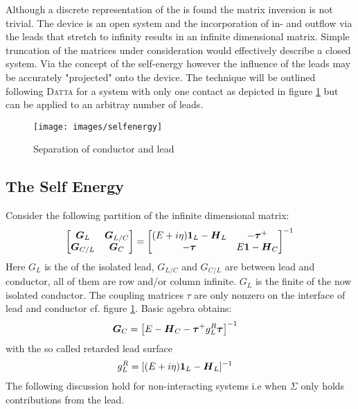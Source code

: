 Although a discrete representation of the \hamil{} is found the matrix inversion is not trivial. The device is an open system and the incorporation of in- and outflow via the leads that stretch to infinity results in an infinite dimensional matrix.
Simple truncation of the matrices under consideration would effectively describe a closed system. Via the concept of the self-energy however the influence of the leads may be accurately "projected" onto the device.
The technique will be outlined following \textsc{Datta} for a system with only one contact as depicted in figure \ref{fig:selfenergy} but can be applied to an arbitray number of leads. \begin{figure}[h!]
\centering
\texttt{[image: images/selfenergy]}
\caption{Separation of conductor and lead}
\label{fig:selfenergy}
\end{figure}

\subsection{The Self Energy}
Consider the following partition of the infinite dimensional \gfnc{} matrix:
\begin{align}
  \begin{bmatrix}
  \boldsymbol{G}_{L} & \boldsymbol{G}_{L/C}\\
  \boldsymbol{G}_{C/L} & \boldsymbol{G}_{C}
  \end{bmatrix}
  =
  \begin{bmatrix}
  (E+i\eta)\boldsymbol{1}_{L} - \boldsymbol{H}_L  & -\boldsymbol{\tau}^+ \\
	-\boldsymbol{\tau} & E\boldsymbol{1} - \boldsymbol{H}_C
  \end{bmatrix}^{-1}
  \label{eqn:greendivided}
\end{align}
Here $G_L$ is the \gfnc{} of the isolated lead, $G_{L/C}$ and $G_{C/L}$ are \gfnc{} between lead and conductor, all of them are row and/or column infinite. $G_L$ is the finite \gfnc{} of the now isolated conductor. The coupling matrices $\tau$ are only nonzero on the interface of lead and conductor cf. figure \ref{fig:selfenergy}.
Basic agebra obtains\cite{Datta1997}:
\begin{align}
\boldsymbol{G}_C& = \left[E-\boldsymbol{H}_C - \boldsymbol{\tau}^+ g_L^R \boldsymbol{\tau}\right]^{-1} 
\label{eqn:finitegreensfunction}
\end{align}
with the so called retarded lead surface \gfnc{}
\begin{align}
g_L^R &= [(E+i\eta)\boldsymbol{1}_L - \boldsymbol{H}_L]^{-1}
\label{eqn:leadsurfacegfnc}
\end{align}
The following discussion hold for non-interacting systems i.e  when $\Sigma$ only holds contributions from the lead.

